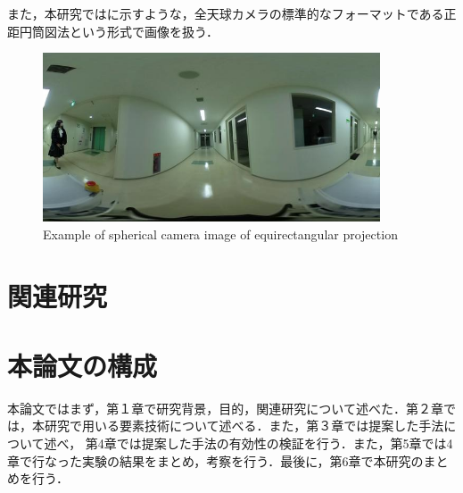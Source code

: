 \documentclass[../main]{subfiles}
\begin{document}
        また，本研究ではに示すような，全天球カメラの標準的なフォーマットである正距円筒図法という形式で画像を扱う．

        \begin{figure}[H]
            \centering
            \includegraphics[width=10cm]{../images/18F_aisle_exp.jpg}
            \caption{Example of spherical camera image of equirectangular projection}
            \label{figure::image_exp}
        \end{figure}
        
        \newpage

        \section{関連研究}
        

        \section{本論文の構成}
        本論文ではまず，第１章で研究背景，目的，関連研究について述べた．第２章では，本研究で用いる要素技術について述べる．また，第３章では提案した手法について述べ，
        第4章では提案した手法の有効性の検証を行う．また，第5章では4章で行なった実験の結果をまとめ，考察を行う．最後に，第6章で本研究のまとめを行う．
\end{document}
